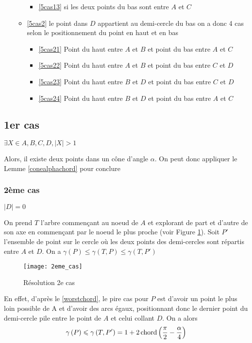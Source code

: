 \begin{itemize}
\begin{itemize}
\begin{itemize}
			\item \ref{5cas13} si les deux points du bas sont entre $A$ et $C$
		\end{itemize}
		\item \ref{5cas2} le point dans $D$ appartient au demi-cercle du bas
		on a donc 4 cas selon le positionnement du point en haut et en bas
		\begin{itemize}
			\item \ref{5cas21} Point du haut entre $A$ et $B$ et point du bas entre $A$ et $C$
			\item \ref{5cas22} Point du haut entre $A$ et $B$ et point du bas entre $C$ et $D$
			\item \ref{5cas23} Point du haut entre $B$ et $D$ et point du bas entre $C$ et $D$
			\item \ref{5cas24} Point du haut entre $B$ et $D$ et point du bas entre $A$ et $C$
		\end{itemize}
	\end{itemize}
\end{itemize}

\subsection*{1er cas}\label{1cas} $\exists X \in {A,B,C,D}, |X| > 1$

Alors, il existe deux points dans un cône d'angle $\alpha$. On peut donc appliquer le Lemme \ref{conealphachord} pour conclure

\subsubsection*{2ème cas}\label{2cas} $|D| = 0$

On prend $T$ l'arbre commençant au noeud de $A$ et explorant de part et d'autre
de son axe en commençant par le noeud le plus proche (voir Figure \ref{fig:2eme_cas}).
Soit $P'$ l'ensemble de point sur le cercle où les deux points des demi-cercles sont répartis entre $A$ et $D$.
On a $\gamma\left(P\right) \leq  \gamma\left(T, P\right) \leq \gamma\left(T, P'\right)$

\begin{figure}[h!]
  \centering
  \texttt{[image: 2eme\_cas]}
  \caption{Résolution 2e cas}
  \label{fig:2eme_cas}
\end{figure}

En effet, d'après le \cref{worstchord}, le pire cas pour $P$ est d'avoir un point le plus loin possible de A et d'avoir des arcs égaux, positionnant donc le dernier point du demi-cercle pile entre le point de $A$ et celui collant $D$. On a alors
$$\gamma\left(P\right) \leqslant \gamma\left(T, P'\right) = 1 + 2\operatorname{chord}\left(\frac{\pi}{2} -
  \frac{\alpha}{4}\right)$$

